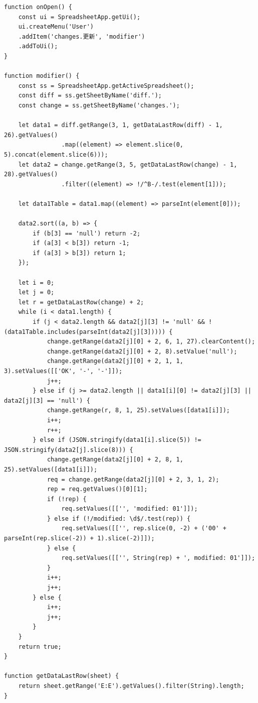 \documentclass[a4paper]{ltjsreport}
\begin{document}
\begin{lstlisting}
function onOpen() {
    const ui = SpreadsheetApp.getUi();
    ui.createMenu('User')
    .addItem('changes.更新', 'modifier')
    .addToUi();
}

function modifier() {
    const ss = SpreadsheetApp.getActiveSpreadsheet();
    const diff = ss.getSheetByName('diff.');
    const change = ss.getSheetByName('changes.');

    let data1 = diff.getRange(3, 1, getDataLastRow(diff) - 1, 26).getValues()
                .map((element) => element.slice(0, 5).concat(element.slice(6)));
    let data2 = change.getRange(3, 5, getDataLastRow(change) - 1, 28).getValues()
                .filter((element) => !/^B-/.test(element[1]));

    let data1Table = data1.map((element) => parseInt(element[0]));

    data2.sort((a, b) => {
        if (b[3] == 'null') return -2;
        if (a[3] < b[3]) return -1;
        if (a[3] > b[3]) return 1;
    });

    let i = 0;
    let j = 0;
    let r = getDataLastRow(change) + 2;
    while (i < data1.length) {
        if (j < data2.length && data2[j][3] != 'null' && !(data1Table.includes(parseInt(data2[j][3])))) {
            change.getRange(data2[j][0] + 2, 6, 1, 27).clearContent();
            change.getRange(data2[j][0] + 2, 8).setValue('null');
            change.getRange(data2[j][0] + 2, 1, 1, 3).setValues([['OK', '-', '-']]);
            j++;
        } else if (j >= data2.length || data1[i][0] != data2[j][3] || data2[j][3] == 'null') {
            change.getRange(r, 8, 1, 25).setValues([data1[i]]);
            i++;
            r++;
        } else if (JSON.stringify(data1[i].slice(5)) != JSON.stringify(data2[j].slice(8))) {
            change.getRange(data2[j][0] + 2, 8, 1, 25).setValues([data1[i]]);
            req = change.getRange(data2[j][0] + 2, 3, 1, 2);
            rep = req.getValues()[0][1];
            if (!rep) {
                req.setValues([['', 'modified: 01']]);
            } else if (!/modified: \d$/.test(rep)) {
                req.setValues([['', rep.slice(0, -2) + ('00' + parseInt(rep.slice(-2)) + 1).slice(-2)]]);
            } else {
                req.setValues([['', String(rep) + ', modified: 01']]);
            }
            i++;
            j++;
        } else {
            i++;
            j++;
        }
    }
    return true;
}

function getDataLastRow(sheet) {
    return sheet.getRange('E:E').getValues().filter(String).length;
}
\end{lstlisting}
\end{document}
